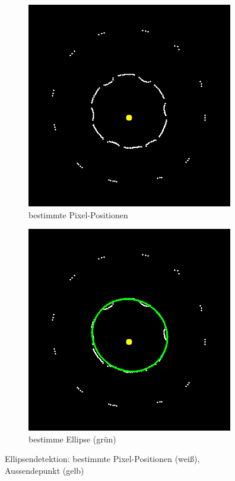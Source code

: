 \begin{figure}[!htb]
	\centering
	\begin{subfigure}{.46\textwidth}
		\centering
		\includegraphics[width=.9\textwidth]{images/rayCast0.png}
		\caption{bestimmte Pixel-Positionen}
		\label{fig:rayCastWOE}
	\end{subfigure}%
	\begin{subfigure}{.46\textwidth}
		\centering
		\includegraphics[width=.9\textwidth]{images/rayCast0Ellipse.png}
		\caption{bestimme Ellipse (grün)}
		\label{fig:rayCastWE}
	\end{subfigure}
	\caption[Ellipsendetektion: bestimmte Pixel-Positionen und Aussendepunkt]{Ellipsendetektion: bestimmte Pixel-Positionen (weiß), Aussendepunkt (gelb)}
	\label{fig:rayCast}
\end{figure}

